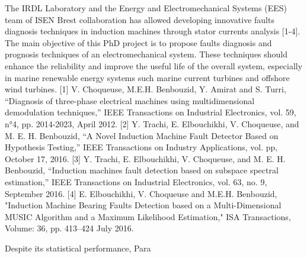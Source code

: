 \documentclass{article}
\begin{document}
The IRDL Laboratory and the Energy and Electromechanical Systems (EES) team of ISEN Brest collaboration has allowed developing innovative faults diagnosis techniques in induction machines through stator currents analysis [1-4].  The main objective of this PhD project is to propose faults diagnosis and prognosis techniques of an electromechanical system. These techniques should enhance the reliability and improve the useful life of the overall system, especially in marine renewable energy systems such marine current turbines and offshore wind turbines.
[1]	V. Choqueuse, M.E.H. Benbouzid, Y. Amirat and S. Turri, “Diagnosis of three-phase electrical machines using multidimensional demodulation techniques,” IEEE Transactions on Industrial Electronics, vol. 59, n°4, pp. 2014-2023, April 2012.
[2]	Y. Trachi, E. Elbouchikhi, V. Choqueuse, and M. E. H. Benbouzid, “A Novel Induction Machine Fault Detector Based on Hypothesis Testing,” IEEE Transactions on Industry Applications, vol. pp, October 17, 2016. 
[3]	Y. Trachi, E. Elbouchikhi, V. Choqueuse, and M. E. H. Benbouzid, “Induction machines fault detection based on subspace spectral estimation,” IEEE Transactions on Industrial Electronics, vol. 63, no. 9, September 2016. 
[4]	E. Elbouchikhi, V. Choqueuse and M.E.H. Benbouzid, "Induction Machine Bearing Faults Detection based on a Multi-Dimensional MUSIC Algorithm and a Maximum Likelihood Estimation," ISA Transactions, Volume: 36, pp. 413–424 July 2016. 



Despite its statistical performance, Para



   
\end{document}
